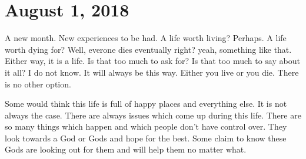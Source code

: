 \section{August 1, 2018}

A new month. New experiences to be had. A life worth living? Perhaps. A life worth
dying for? Well, everone dies eventually right? yeah, something like that. Either
way, it is a life. Is that too much to ask for? Is that too much to say about it all?
I do not know. It will always be this way. Either you live or you die. There is no
other option.

Some would think this life is full of happy places and everything else. It is not
always the case. There are always issues which come up during this life. There are so
many things which happen and which people don't have control over. They look towards
a God or Gods and hope for the best. Some claim to know these Gods are looking out
for them and will help them no matter what.
